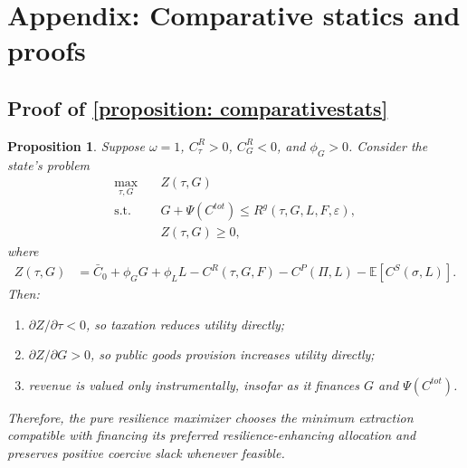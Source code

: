 \documentclass[12pt]{article}
\newtheorem{proposition}{Proposition}
\newcommand{\E}{\mathbb{E}}
\begin{document}
\section*{Appendix: Comparative statics and proofs}

\subsection{Proof of \ref{proposition: comparativestats}}

\begin{proposition}
Suppose $\omega = 1$, $C^R_\tau > 0$, $C^R_G < 0$, and $\phi_G>0$. Consider the state's problem
\begin{align}
\max_{\tau,G} \quad & Z(\tau,G) \\
\text{s.t.} \quad & G + \Psi(C^{tot}) \le R^g(\tau,G,L,F,\varepsilon), \\
& Z(\tau,G) \ge 0,
\end{align}
where
\begin{align}
Z(\tau,G)
&= \bar C_0 + \phi_G G + \phi_L L
- C^R(\tau,G,F) - C^P(\Pi,L) - \E[C^S(\sigma,L)].
\end{align}
Then:
\begin{enumerate}
    \item $\partial Z/\partial \tau < 0$, so taxation reduces utility directly;
    \item $\partial Z/\partial G > 0$, so public goods provision increases utility directly;
    \item revenue is valued only instrumentally, insofar as it finances $G$ and $\Psi(C^{tot})$.
\end{enumerate}
Therefore, the pure resilience maximizer chooses the minimum extraction compatible with financing its preferred resilience-enhancing allocation and preserves positive coercive slack whenever feasible.
\end{proposition}
\end{document}
